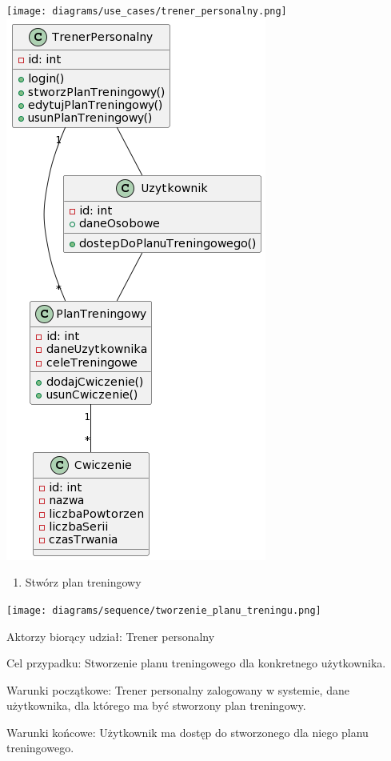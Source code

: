 \documentclass[
]{article}
\providecommand{\tightlist}{%
  \setlength{\itemsep}{0pt}\setlength{\parskip}{0pt}}
\begin{document}
{\texttt{[image: diagrams/use\_cases/trener\_personalny.png]}}
{\includegraphics{diagrams/class/trener_personalny_klasy.png}}

\begin{enumerate}
\tightlist
\item
  {Stwórz plan treningowy}
\end{enumerate}

{\texttt{[image: diagrams/sequence/tworzenie\_planu\_treningu.png]}}

{}

{Aktorzy biorący udział: Trener personalny}

{Cel przypadku: Stworzenie planu treningowego dla konkretnego
użytkownika.}

{Warunki początkowe: Trener personalny zalogowany w systemie, dane
użytkownika, dla którego ma być stworzony plan treningowy.}

{Warunki końcowe: Użytkownik ma dostęp do stworzonego dla niego planu
treningowego.}
\end{document}
